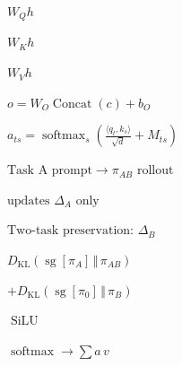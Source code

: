 \documentclass{article}
\begin{document}
\begin{preview}
{\fontsize{18}{21.599999999999998}\selectfont\color[HTML]{222222}$\displaystyle W_{Q}h$}
\end{preview}
\begin{preview}
{\fontsize{18}{21.599999999999998}\selectfont\color[HTML]{222222}$\displaystyle W_{K}h$}
\end{preview}
\begin{preview}
{\fontsize{18}{21.599999999999998}\selectfont\color[HTML]{222222}$\displaystyle W_{V}h$}
\end{preview}
\begin{preview}
{\fontsize{21}{25.2}\selectfont\color[HTML]{222222}$\displaystyle o = W_{O} \operatorname{Concat}(c) + b_{O}$}
\end{preview}
\begin{preview}
{\fontsize{20}{24.0}\selectfont\color[HTML]{222222}$\displaystyle a_{ts}=\operatorname{softmax}_{s}\!\left(\frac{\langle q_t,k_s\rangle}{\sqrt{d}}+M_{ts}\right)$}
\end{preview}
\begin{preview}
{\fontsize{25}{30.0}\selectfont\color[HTML]{222222}$\displaystyle \text{Task A prompt}\to\pi_{AB}\text{ rollout}$}
\end{preview}
\begin{preview}
{\fontsize{27}{32.4}\selectfont\color[HTML]{2563EB}$\displaystyle \text{updates }\Delta_A\text{ only}$}
\end{preview}
\begin{preview}
{\fontsize{24}{28.799999999999997}\selectfont\color[HTML]{D97706}$\displaystyle \text{Two-task preservation: }\Delta_B$}
\end{preview}
\begin{preview}
{\fontsize{24}{28.799999999999997}\selectfont\color[HTML]{222222}$\displaystyle D_{\mathrm{KL}}\!\left(\operatorname{sg}[\pi_A]\,\Vert\,\pi_{AB}\right)$}
\end{preview}
\begin{preview}
{\fontsize{24}{28.799999999999997}\selectfont\color[HTML]{222222}$\displaystyle +D_{\mathrm{KL}}\!\left(\operatorname{sg}[\pi_0]\,\Vert\,\pi_B\right)$}
\end{preview}
\begin{preview}
{\fontsize{25}{30.0}\selectfont\color[HTML]{222222}$\displaystyle \operatorname{SiLU}$}
\end{preview}
\begin{preview}
{\fontsize{22}{26.4}\selectfont\color[HTML]{222222}$\displaystyle \operatorname{softmax}\to\sum a\,v$}
\end{preview}
\end{document}

